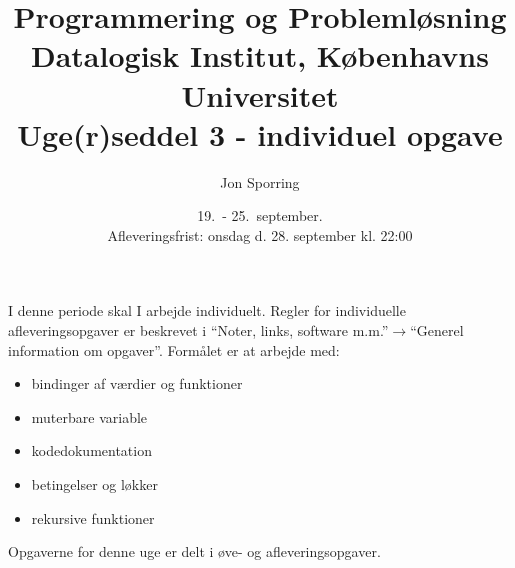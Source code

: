 \documentclass[a4paper,12pt]{article}
\title{Programmering og Problemløsning\\Datalogisk Institut,
  Københavns Universitet\\Uge(r)seddel 3 - individuel opgave}
\author{Jon Sporring}
\date{19.\ - 25.\ september.\\Afleveringsfrist: onsdag d. 28. september kl. 22:00}
\begin{document}
\maketitle

I denne periode skal I arbejde individuelt. Regler for individuelle afleveringsopgaver er beskrevet i "`Noter, links, software m.m."'$\rightarrow$"`Generel information om opgaver"'. Formålet er at arbejde med:
\begin{itemize}
\item bindinger af værdier og funktioner
\item muterbare variable
\item kodedokumentation
\item betingelser og løkker
\item rekursive funktioner
\end{itemize}

Opgaverne for denne uge er delt i øve- og afleveringsopgaver. 
\end{document}
